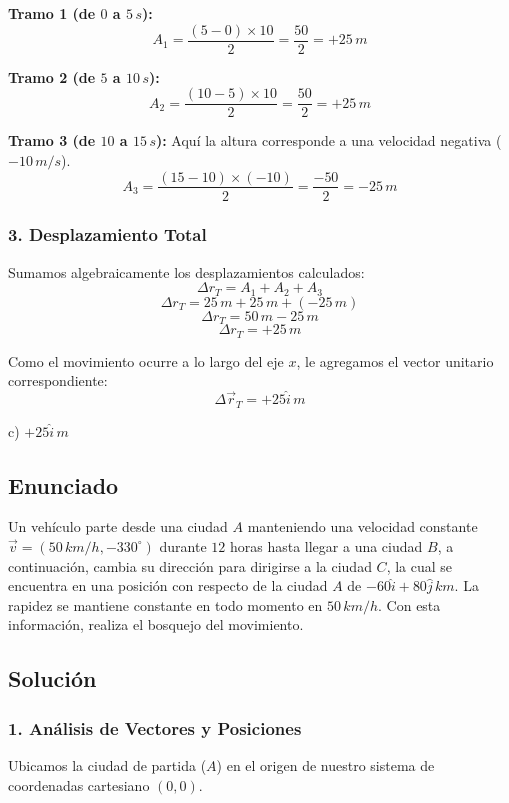 \documentclass[12pt, a4paper]{article}
\begin{document}
\textbf{Tramo 1 (de $0$ a $5 \, \si{s}$):}
$$ A_1 = \frac{(5 - 0) \times 10}{2} = \frac{50}{2} = +25 \, \si{m} $$

\textbf{Tramo 2 (de $5$ a $10 \, \si{s}$):}
$$ A_2 = \frac{(10 - 5) \times 10}{2} = \frac{50}{2} = +25 \, \si{m} $$

\textbf{Tramo 3 (de $10$ a $15 \, \si{s}$):}
Aquí la altura corresponde a una velocidad negativa ($-10 \, \si{m/s}$).
$$ A_3 = \frac{(15 - 10) \times (-10)}{2} = \frac{-50}{2} = -25 \, \si{m} $$

\subsubsection*{3. Desplazamiento Total}
Sumamos algebraicamente los desplazamientos calculados:
$$ \Delta r_T = A_1 + A_2 + A_3 $$
$$ \Delta r_T = 25 \, \si{m} + 25 \, \si{m} + (-25 \, \si{m}) $$
$$ \Delta r_T = 50 \, \si{m} - 25 \, \si{m} $$
$$ \Delta r_T = +25 \, \si{m} $$

Como el movimiento ocurre a lo largo del eje $x$, le agregamos el vector unitario correspondiente:
$$ \Delta\vec{r}_T = +25\hat{i} \, \si{m} $$

\begin{tcolorbox}[colback=green!5!white, colframe=green!50!black, title=Respuesta Final]
\centering \Large c) $+25\hat{i} \, \si{m}$
\end{tcolorbox}

\newpage

\subsection*{Enunciado}
Un vehículo parte desde una ciudad $A$ manteniendo una velocidad constante $\vec{v} = (50 \, \si{km/h}, -330^\circ)$ durante $12$ horas hasta llegar a una ciudad $B$, a continuación, cambia su dirección para dirigirse a la ciudad $C$, la cual se encuentra en una posición con respecto de la ciudad $A$ de $-60\hat{i} + 80\hat{j} \, \si{km}$. La rapidez se mantiene constante en todo momento en $50 \, \si{km/h}$. Con esta información, realiza el bosquejo del movimiento.

\subsection*{Solución}

\subsubsection*{1. Análisis de Vectores y Posiciones}
Ubicamos la ciudad de partida ($A$) en el origen de nuestro sistema de coordenadas cartesiano $(0,0)$.
\end{document}
